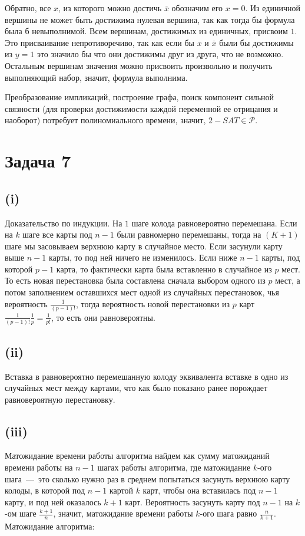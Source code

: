 \documentclass[a4paper,12pt]{article} %
\begin{document}
Обратно, все $x$, из которого можно достичь $\overline{x}$ обозначим его $x=0$. Из единичной вершины не может быть достижима нулевая вершина, так как тогда бы формула была б невыполнимой. Всем вершинам, достижимых из единичных, присвоим $1$. Это присваивание непротиворечиво, так как если бы $x$ и $\overline{x}$ были бы достижимы из $y=1$ это значило бы что они достижимы друг из друга, что не возможно. Остальным вершинам значения можно присвоить произвольно и получить выполняющий набор, значит, формула выполнима.

Преобразование импликаций, построение графа, поиск компонент сильной связности (для проверки достижимости каждой переменной ее отрицания и наоборот) потребует полиномиального времени, значит, $2-SAT\in\mathcal{P}$.


\section{Задача 7}
\subsection{(i)}
\hspace{5mm}
Доказательство по индукции. На $1$ шаге колода равновероятно перемешана. Если на $k$ шаге все карты под $n-1$ были равномерно перемешаны, тогда на $(K+1)$ шаге мы засовываем верхнюю карту в случайное место. Если засунули карту выше $n-1$ карты, то под ней ничего не изменилось. Если ниже $n-1$ карты, под которой $p-1$ карта, то фактически карта была вставленно в случайное из $p$ мест. То есть новая перестановка была составлена сначала выбором одного из $p$ мест, а потом заполнением оставшихся мест одной из случайных перестановок, чья вероятность $\frac{1}{(p-1)!}$, тогда вероятность новой перестановки из $p$ карт $\frac{1}{(p-1)!}\frac{1}{p}=\frac{1}{p!}$, то есть они равновероятны.


\subsection{(ii)}
\hspace{5mm}
Вставка в равновероятно перемешанную колоду эквивалента вставке в одно из случайных мест между картами, что как было показано ранее порождает равновероятную перестановку.

\subsection{(iii)}
\hspace{5mm}
Матожидание времени работы алгоритма найдем как сумму матожиданий времени работы на $n-1$ шагах работы алгоритма, где матожидание $k$-ого шага~---~это сколько нужно раз в среднем попытаться засунуть верхнюю карту колоды, в которой под $n-1$ картой $k$ карт, чтобы она вставилась под $n-1$ карту, и под ней оказалось $k+1$ карт. Вероятность засунуть карту под $n-1$ на $k$-ом шаге $\frac{k+1}{n}$, значит, матожидание времени работы $k$-ого шага равно $\frac{n}{k+1}$. Матожидание алгоритма:
\end{document}
